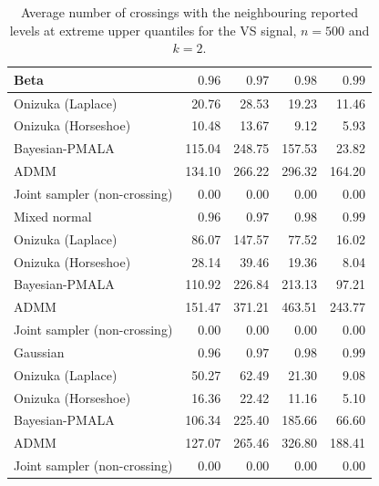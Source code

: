 \begin{table}[!htbp]
\centering
\small
\caption{Average number of crossings with the neighbouring reported levels at extreme upper quantiles for the VS signal, $n=500$ and $k=2$.}
\label{tab:vs_ext_upper_cross_nb}
\begin{tabular}{lrrrr}
\toprule
Beta & $0.96$ & $0.97$ & $0.98$ & $0.99$ \\
\midrule
Onizuka (Laplace) & 20.76 & 28.53 & 19.23 & 11.46 \\
Onizuka (Horseshoe) & 10.48 & 13.67 & 9.12 & 5.93 \\
Bayesian-PMALA & 115.04 & 248.75 & 157.53 & 23.82 \\
ADMM & 134.10 & 266.22 & 296.32 & 164.20 \\
Joint sampler (non-crossing) & 0.00 & 0.00 & 0.00 & 0.00 \\
\midrule
Mixed normal & $0.96$ & $0.97$ & $0.98$ & $0.99$ \\
\midrule
Onizuka (Laplace) & 86.07 & 147.57 & 77.52 & 16.02 \\
Onizuka (Horseshoe) & 28.14 & 39.46 & 19.36 & 8.04 \\
Bayesian-PMALA & 110.92 & 226.84 & 213.13 & 97.21 \\
ADMM & 151.47 & 371.21 & 463.51 & 243.77 \\
Joint sampler (non-crossing) & 0.00 & 0.00 & 0.00 & 0.00 \\
\midrule
Gaussian & $0.96$ & $0.97$ & $0.98$ & $0.99$ \\
\midrule
Onizuka (Laplace) & 50.27 & 62.49 & 21.30 & 9.08 \\
Onizuka (Horseshoe) & 16.36 & 22.42 & 11.16 & 5.10 \\
Bayesian-PMALA & 106.34 & 225.40 & 185.66 & 66.60 \\
ADMM & 127.07 & 265.46 & 326.80 & 188.41 \\
Joint sampler (non-crossing) & 0.00 & 0.00 & 0.00 & 0.00 \\
\bottomrule
\end{tabular}
\end{table}

